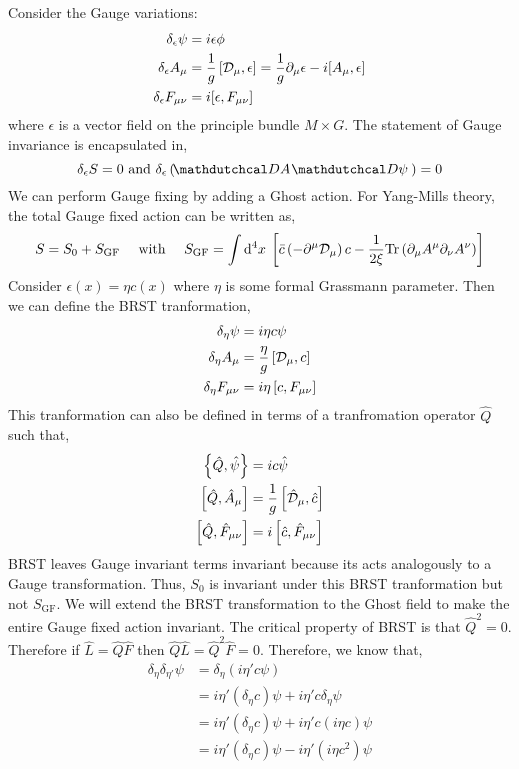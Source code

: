 \documentclass[12pt]{extarticle}
\begin{document}
Consider the Gauge variations:
\begin{align*}
\delta_{\epsilon} \psi & = i \epsilon \phi 
\\
\delta_{\epsilon} A_\mu & = \frac{1}{g} \left[ \mathcal{D}_\mu, \epsilon \right] = \frac{1}{g} \partial_\mu \epsilon - i [A_\mu, \epsilon ]
\\
\delta_{\epsilon} F_{\mu \nu} & = i [ \epsilon, F_{\mu \nu} ] 
\end{align*}
where $\epsilon$ is a vector field on the principle bundle $M \times G$. The statement of Gauge invariance is encapsulated in,
\[ \delta_{\epsilon} S = 0 \text{ and } \delta_{\epsilon} \left( \pathd{A} \pathd{\psi} \right) = 0 \]
We can perform Gauge fixing by adding a Ghost action. For Yang-Mills theory, the total Gauge fixed action can be written as,
\[ S = S_0 + S_{\mathrm{GF}} \quad \text{ with } \quad S_{\mathrm{GF}} = \int \mathrm{d}^{4} x \: \left[ \bar{c} \left( - \partial^\mu \mathcal{D}_\mu \right) c - \frac{1}{2 \xi} \mathrm{Tr}\left(  \partial_\mu A^\mu \partial_\nu A^\nu  \right) \right]  \]
Consider $\epsilon(x) = \eta c(x)$ where $\eta$ is some formal Grassmann parameter. Then we can define the BRST tranformation,
\begin{align*}
\delta_{\eta} \psi & = i \eta c \psi
\\
\delta_{\eta} A_\mu & = \frac{\eta}{g} \left[ \mathcal{D}_\mu, c \right] 
\\
\delta_{\eta} F_{\mu \nu} & = i \eta \left[ c, F_{\mu \nu} \right]
\end{align*} 
This tranformation can also be defined in terms of a tranfromation operator $\hat{Q}$ such that,
\begin{align*}
\left\{ \hat{Q}, \hat{\psi} \right\} & = i c \hat{\psi} 
\\
\left[ \hat{Q}, \hat{A}_\mu \right] & = \frac{1}{g} \left[ \hat{\mathcal{D}}_\mu, \hat{c} \right]
\\
\left[ \hat{Q}, \hat{F}_{\mu\nu} \right] & = i \left[ \hat{c}, \hat{F}_{\mu \nu} \right]
\end{align*}
BRST leaves Gauge invariant terms invariant because its acts analogously to a Gauge transformation. Thus, $S_0$ is invariant under this BRST tranformation but not $S_{\mathrm{GF}}$. We will extend the BRST transformation to the Ghost field to make the entire Gauge fixed action invariant. The critical property of BRST is that $\hat{Q}^2 = 0$. Therefore if $\hat{L} = \hat{Q} \hat{F}$ then $\hat{Q} \hat{L} = \hat{Q}^2 \hat{F} = 0$. Therefore, we know that,
\begin{align*}
\delta_{\eta} \delta_{\eta'} \psi & = \delta_{\eta} \left( i \eta' c \psi \right)
\\
& = i \eta' \left( \delta_{\eta} c\right) \psi + i \eta' c \delta_{\eta} \psi
\\
& =  i \eta' \left( \delta_{\eta} c\right) \psi + i \eta' c (i \eta c) \psi 
\\
& =  i \eta' \left( \delta_{\eta} c\right) \psi - i \eta' (i \eta c^2) \psi 
\end{align*}
\end{document}
